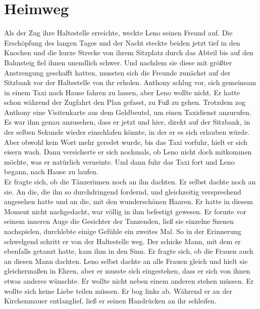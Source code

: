 \documentclass[ngerman,smalldemyvopaper,11pt,oneside,onecolumn,openright,extrafontsizes]{memoir}
\begin{document}
\chapter{Heimweg}
Als der Zug ihre Haltestelle erreichte, weckte Leno seinen Freund auf. Die Erschöpfung des langen Tages und der Nacht steckte beiden jetzt tief in den Knochen und die kurze Strecke von ihrem Sitzplatz durch das Abteil bis auf den Bahnsteig fiel ihnen unendlich schwer. Und nachdem sie diese mit größter Anstrengung geschafft hatten, mussten sich die Freunde zunächst auf der Sitzbank vor der Haltestelle von ihr erholen. Anthony schlug vor, sich gemeinsam in einem Taxi nach Hause fahren zu lassen, aber Leno wollte nicht. Er hatte schon während der Zugfahrt den Plan gefasst, zu Fuß zu gehen. Trotzdem zog Anthony eine Visitenkarte aus dem Geldbeutel, um einen Taxidienst anzurufen. Es war ihm genau anzusehen, dass er jetzt und hier, direkt auf der Sitzbank, in der selben Sekunde wieder einschlafen könnte, in der er es sich erlauben würde. Aber obwohl kein Wort mehr geredet wurde, bis das Taxi vorfuhr, hielt er sich eisern wach. Dann versicherte er sich nochmals, ob Leno nicht doch mitkommen möchte, was er natürlich verneinte. Und dann fuhr das Taxi fort und Leno begann, nach Hause zu laufen. \\
Er fragte sich, ob die Tänzerinnen noch an ihn dachten. Er selbst dachte noch an sie. An die, die ihn so durchdringend fordernd, und gleichzeitig versprechend angesehen hatte und an die, mit den wunderschönen Haaren. Er hatte in diesem Moment nicht nachgedacht, war völlig in ihm befestigt gewesen. Er formte vor seinem inneren Auge die Gesichter der Tanzenden, ließ sie einzelne Szenen nachspielen, durchlebte einige Gefühle ein zweites Mal. So in der Erinnerung schwelgend schritt er von der Haltestelle weg. Der schicke Mann, mit dem er ebenfalls getanzt hatte, kam ihm in den Sinn. Er fragte sich, ob die Frauen auch an diesen Mann dachten. Leno selbst dachte an alle Frauen gleich und hielt sie gleichermaßen in Ehren, aber er musste sich eingestehen, dass er sich von ihnen etwas anderes wünschte. Er wollte nicht neben einem anderen stehen müssen. Er wollte sich keine Liebe teilen müssen. Er bog links ab. Während er an der Kirchenmauer entlanglief, ließ er seinen Handrücken an ihr schleifen.\\
\end{document}
